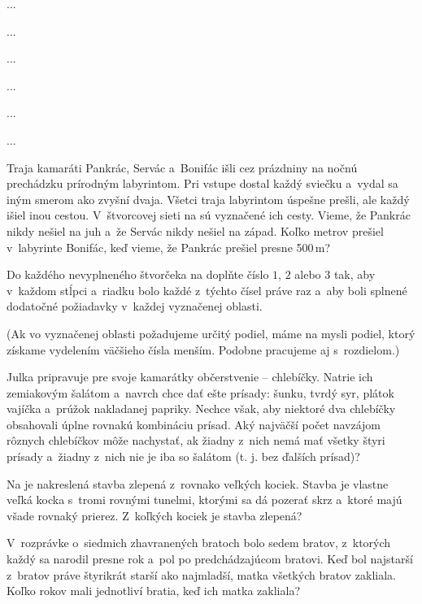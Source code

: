 ﻿{%
...}

{%
...}

{%
...}

{%
...}

{%
...}

{%
...}

{%
Traja kamaráti Pankrác, Servác a~Bonifác išli cez prázdniny na nočnú prechádzku
prírodným labyrintom. Pri vstupe dostal každý sviečku a~vydal sa iným smerom
ako zvyšní dvaja. Všetci traja labyrintom úspešne prešli, ale každý išiel inou cestou.
V~štvorcovej sieti na \obr{} sú vyznačené ich cesty. Vieme, že Pankrác
nikdy nešiel na juh a~že Servác nikdy nešiel na západ. Koľko metrov prešiel
v~labyrinte Bonifác, keď vieme, že Pankrác prešiel presne 500\,m?
%
}

{%
Do každého nevyplneného štvorčeka na \obr{} doplňte číslo $1$, $2$ alebo $3$ tak, aby v~každom stĺpci a~riadku bolo každé z~týchto čísel práve raz a~aby boli splnené dodatočné požiadavky v~každej vyznačenej oblasti.
%

(Ak vo vyznačenej oblasti požadujeme určitý podiel, máme na mysli podiel, ktorý získame vydelením väčšieho čísla menším. Podobne pracujeme aj s~rozdielom.)
}

{%
Julka pripravuje pre svoje kamarátky občerstvenie -- chlebíčky. Natrie ich
zemiakovým šalátom a~navrch chce dať ešte prísady: šunku, tvrdý syr, plátok vajíčka a~prúžok nakladanej papriky. Nechce však, aby niektoré dva chlebíčky obsahovali
úplne rovnakú kombináciu prísad. Aký najväčší počet navzájom rôznych chlebíčkov
môže nachystať, ak žiadny z~nich nemá mať všetky štyri prísady a~žiadny z~nich
nie je iba so šalátom (t. j. bez ďalších prísad)?
}

{%
Na \obr{} je nakreslená stavba zlepená z~rovnako veľkých kociek. Stavba je vlastne
veľká kocka s~tromi rovnými tunelmi, ktorými sa dá pozerať skrz a~ktoré majú všade
rovnaký prierez. Z~koľkých kociek je stavba zlepená?
%
}

{%
V~rozprávke o~siedmich zhavranených bratoch bolo sedem bratov, z~ktorých každý sa
narodil presne rok a~pol po predchádzajúcom bratovi. Keď bol najstarší z~bratov práve
štyrikrát starší ako najmladší, matka všetkých bratov zakliala. Koľko rokov
mali jednotliví bratia, keď ich matka zakliala?}

